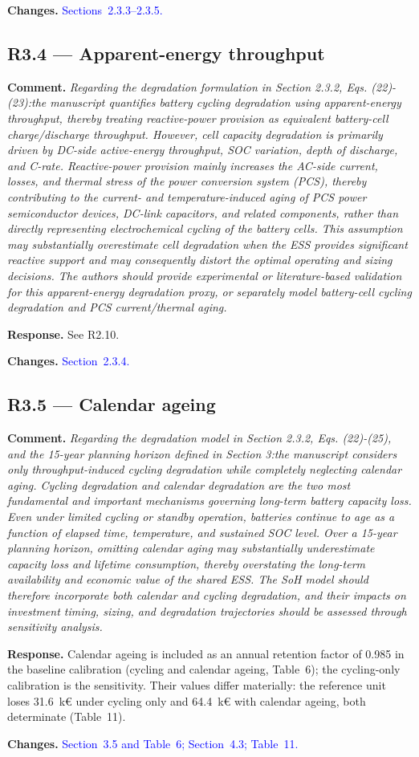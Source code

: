 \documentclass[11pt]{article}
\newcommand{\rcomment}[1]{\par\medskip\noindent\textbf{Comment.} \textit{#1}\par\smallskip}
\newcommand{\rresponse}[1]{\noindent\textbf{Response.} #1\par\smallskip}
\newcommand{\rchanges}[1]{\noindent\textbf{Changes.} \textcolor{blue}{#1}\par\medskip}
\begin{document}
\rchanges{Sections~2.3.3--2.3.5.}

\subsection*{R3.4 --- Apparent-energy throughput}
\rcomment{
Regarding the degradation formulation in Section 2.3.2, Eqs. (22)-(23):the manuscript quantifies battery cycling degradation using apparent-energy throughput, thereby treating reactive-power provision as equivalent battery-cell charge/discharge throughput. However, cell capacity degradation is primarily driven by DC-side active-energy throughput, SOC variation, depth of discharge, and C-rate. Reactive-power provision mainly increases the AC-side current, losses, and thermal stress of the power conversion system (PCS), thereby contributing to the current- and temperature-induced aging of PCS power semiconductor devices, DC-link capacitors, and related components, rather than directly representing electrochemical cycling of the battery cells. This assumption may substantially overestimate cell degradation when the ESS provides significant reactive support and may consequently distort the optimal operating and sizing decisions. The authors should provide experimental or literature-based validation for this apparent-energy degradation proxy, or separately model battery-cell cycling degradation and PCS current/thermal aging.
}
\rresponse{See R2.10.}
\rchanges{Section~2.3.4.}

\subsection*{R3.5 --- Calendar ageing}
\rcomment{
Regarding the degradation model in Section 2.3.2, Eqs. (22)-(25), and the 15-year planning horizon defined in Section 3:the manuscript considers only throughput-induced cycling degradation while completely neglecting calendar aging. Cycling degradation and calendar degradation are the two most fundamental and important mechanisms governing long-term battery capacity loss. Even under limited cycling or standby operation, batteries continue to age as a function of elapsed time, temperature, and sustained SOC level. Over a 15-year planning horizon, omitting calendar aging may substantially underestimate capacity loss and lifetime consumption, thereby overstating the long-term availability and economic value of the shared ESS. The SoH model should therefore incorporate both calendar and cycling degradation, and their impacts on investment timing, sizing, and degradation trajectories should be assessed through sensitivity analysis.
}
\rresponse{Calendar ageing is included as an annual retention factor of 0.985 in the baseline calibration (cycling and calendar ageing, Table~6); the cycling-only calibration is the sensitivity. Their values differ materially: the reference unit loses 31.6~k\euro{} under cycling only and 64.4~k\euro{} with calendar ageing, both determinate (Table~11).}
\rchanges{Section~3.5 and Table~6; Section~4.3; Table~11.}
\end{document}
